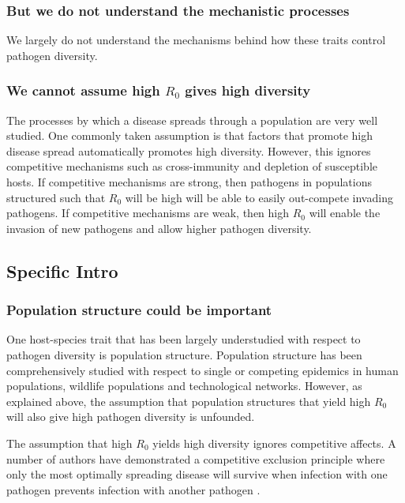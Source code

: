\subsubsection{But we do not understand the mechanistic processes}

We largely do not understand the mechanisms behind how these traits control pathogen diversity.




\subsubsection{We cannot assume high $R_0$ gives high diversity}
The processes by which a disease spreads through a population are very well studied.
One commonly taken assumption is that factors that promote high disease spread automatically promotes high diversity.
However, this ignores competitive mechanisms such as cross-immunity and depletion of susceptible hosts.
If competitive mechanisms are strong, then pathogens in populations structured such that $R_0$ will be high will be able to easily out-compete invading pathogens.
If competitive mechanisms are weak, then high $R_0$ will enable the invasion of new pathogens and allow higher pathogen diversity.




\subsection{Specific Intro}


\subsubsection{Population structure could be important}
One host-species trait that has been largely understudied with respect to pathogen diversity is population structure.
Population structure has been comprehensively studied with respect to single or competing epidemics in human populations, wildlife populations and technological networks.
However, as explained above, the assumption that population structures that yield high $R_0$ will also give high pathogen diversity is unfounded.

The assumption that high $R_0$ yields high diversity ignores competitive affects.
A number of authors have demonstrated a competitive exclusion principle where only the most optimally spreading disease will survive when infection with one pathogen prevents infection with another pathogen \cite{bremermann1989competitive, martcheva2013competitive, ackleh2003competitive, ackleh2014robust, turner2002impact}.



